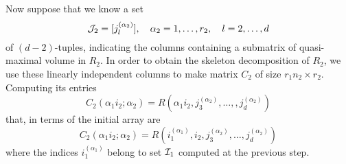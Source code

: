Now suppose that we know a set
\begin{equation*}
  \mathcal{J}_2 = [j_l^{(\alpha_2)}], \quad \alpha_2 = 1,\ldots,r_2, \quad l = 2,\ldots,d
\end{equation*}
of $(d-2)$-tuples, indicating the columns containing a submatrix of quasi-maximal volume in $R_2$. In order to obtain the skeleton decomposition of $R_2$, we use these linearly independent  columns to make matrix $C_2$ of size $r_1 n_2 \times r_2$. Computing its entries
\begin{equation*}
  C_2(\alpha_1 i_2; \alpha_2) = R(\alpha_1 i_2,j_3^{(\alpha_2)},\ldots,,j_d^{(\alpha_2)})
\end{equation*}
that, in terms of the initial array are
\begin{equation*}
  C_2(\alpha_1 i_2; \alpha_2) = R(i_1^{(\alpha_1)},i_2,j_3^{(\alpha_2)},\ldots,j_d^{(\alpha_2)})
\end{equation*}
where the indices $i_1^{(\alpha_1)}$ belong to set $\mathcal{I}_1$ computed at the previous step.
